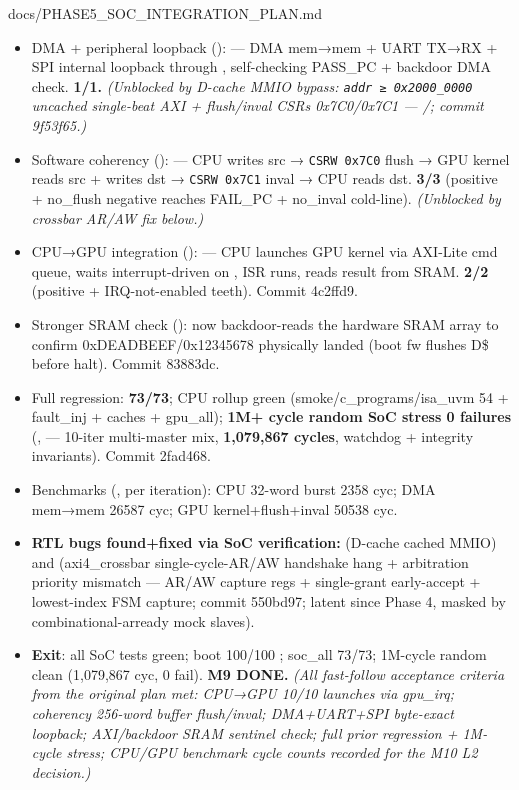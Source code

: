 \begin{relocated}{docs/PHASE5_SOC_INTEGRATION_PLAN.md}
\begin{itemize}
\tightlist
\item
  \ok{} DMA + peripheral loopback ():
   --- DMA mem→mem + UART TX→RX + SPI
  internal loopback through , self-checking PASS\_PC +
  backdoor DMA check. \textbf{1/1.} \emph{(Unblocked by 
  D-cache MMIO bypass: \texttt{addr\ ≥\ 0x2000\_\allowbreak{}0000}
  uncached single-beat AXI + flush/\allowbreak{}inval CSRs
  0x7C0/\allowbreak{}0x7C1 ---
  /; commit 9f53f65.)}
\item
  \ok{} Software coherency (): 
  --- CPU writes src → \texttt{CSRW\ 0x7C0} flush → GPU kernel reads src
  + writes dst → \texttt{CSRW\ 0x7C1} inval → CPU reads dst.
  \textbf{3/3} (positive + no\_flush negative reaches FAIL\_PC +
  no\_inval cold-line). \emph{(Unblocked by  crossbar AR/AW
  fix below.)}
\item
  \ok{} CPU→GPU integration ():  ---
  CPU launches GPU kernel via AXI-Lite cmd queue, waits interrupt-driven
  on , ISR runs, reads result from SRAM. \textbf{2/2}
  (positive + IRQ-not-enabled teeth). Commit 4c2ffd9.
\item
  \ok{} Stronger SRAM check ():
   now backdoor-reads the hardware SRAM
  array to confirm 0xDEADBEEF/\allowbreak{}0x12345678 physically landed
  (boot fw flushes D\$ before halt). Commit 83883dc.
\item
  \ok{} Full regression:  \textbf{73/73}; CPU rollup green
  (smoke/\allowbreak{}c\_\allowbreak{}programs/\allowbreak{}isa\_\allowbreak{}uvm
  54 + fault\_inj + caches + gpu\_all); \textbf{1M+ cycle random SoC
  stress 0 failures} (,  --- 10-iter
  multi-master mix, \textbf{1,079,867 cycles}, watchdog + integrity
  invariants). Commit 2fad468.
\item
  \ok{} Benchmarks (, per iteration): CPU 32-word burst 2358
  cyc; DMA mem→mem 26587 cyc; GPU kernel+flush+inval 50538 cyc.
\item
  \ok{} \textbf{RTL bugs found+fixed via SoC verification:} 
  (D-cache cached MMIO) and  (axi4\_\allowbreak{}crossbar
  single-cycle-AR/\allowbreak{}AW handshake hang + arbitration priority
  mismatch --- AR/AW capture regs + single-grant early-accept +
  lowest-index FSM capture; commit 550bd97; latent since Phase 4, masked
  by combinational-arready mock slaves).
\item
  \textbf{Exit}: \ok{} all SoC tests green; boot 100/100 \ok{}; soc\_all
  73/73; 1M-cycle random clean (1,079,867 cyc, 0 fail). \textbf{M9
  DONE.} \emph{(All fast-follow acceptance criteria from the original
  plan met: CPU→GPU 10/10 launches via gpu\_irq; coherency 256-word
  buffer flush/\allowbreak{}inval; DMA+UART+SPI byte-exact loopback;
  AXI/\allowbreak{}backdoor SRAM sentinel check; full prior regression +
  1M-cycle stress; CPU/GPU benchmark cycle counts recorded for the M10
  L2 decision.)}
\end{itemize}


\end{relocated}
